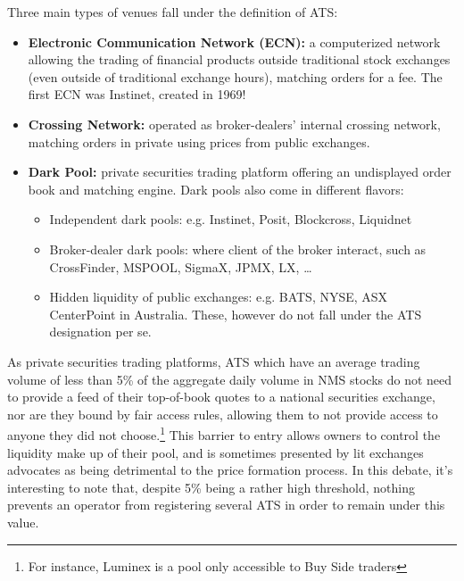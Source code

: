 Three main types of venues fall under the definition of ATS:
\begin{itemize}
\item{\textbf{Electronic Communication Network (ECN):}} a computerized network allowing the trading of financial products outside traditional stock exchanges (even outside of traditional exchange hours), matching orders for a fee. The first ECN was Instinet, created in 1969! 

\item{\textbf{Crossing Network:}} operated as broker-dealers' internal crossing network, matching orders in private using prices from public exchanges.

\item{\textbf{Dark Pool:}} private securities trading platform offering an undisplayed order book and matching engine. Dark pools also come in different flavors:
        \begin{itemize}
        \item{Independent dark pools:} e.g. Instinet, Posit, Blockcross, Liquidnet 
        \item{Broker-dealer dark pools:} where client of the broker interact, such as  CrossFinder, MSPOOL, SigmaX, JPMX, LX, \dots
        \item{Hidden liquidity of public exchanges:} e.g. BATS, NYSE, ASX CenterPoint in Australia. These, however do not fall under the ATS designation per se.
        \end{itemize}
\end{itemize}


As private securities trading platforms, ATS which have an average trading volume of less than 5\% of the aggregate daily volume in NMS stocks do not need to provide a feed of their top-of-book quotes to a national securities exchange, nor are they bound by fair access rules, allowing them to not provide access to anyone they did not choose.\footnote{For instance, Luminex is a pool only accessible to Buy Side traders} This barrier to entry allows owners to control the liquidity make up of their pool, and is sometimes presented by lit exchanges advocates as being detrimental to the price formation process. In this debate, it's interesting to note that, despite 5\% being a rather high threshold, nothing prevents an operator from registering several ATS in order to remain under this value.


